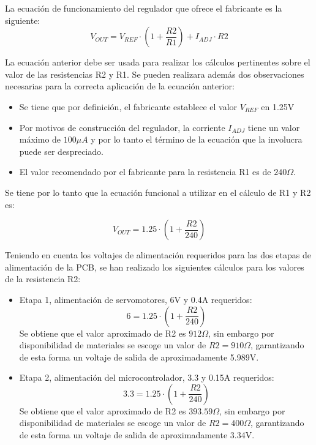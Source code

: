 La ecuación de funcionamiento del regulador que ofrece el fabricante es la siguiente:
\begin{equation}
    V_{OUT} = V_{REF} \cdot ( 1 + \frac{R2}{R1}) + I_{ADJ} \cdot R2
\end{equation}

La ecuación anterior debe ser usada para realizar los cálculos pertinentes sobre el valor de las resistencias R2 y R1. Se pueden realizara además dos observaciones necesarias para la correcta aplicación de la ecuación anterior:
\begin{itemize}
    \item Se tiene que por definición, el fabricante establece el valor $V_{REF}$ en 1.25V
    \item Por motivos de construcción del regulador, la corriente $I_{ADJ}$ tiene un valor máximo de $100 \mu A$ y por lo tanto el término de la ecuación que la involucra puede ser despreciado.
    \item El valor recomendado por el fabricante para la resistencia R1 es de $240 \Omega$.
\end{itemize}

Se tiene por lo tanto que la ecuación funcional a utilizar en el cálculo de R1 y R2 es:

\begin{equation}
    V_{OUT} = 1.25 \cdot ( 1 + \frac{R2}{240}) 
\end{equation}

Teniendo en cuenta los voltajes de alimentación requeridos para las dos etapas de alimentación de la PCB, se han realizado los siguientes cálculos para los valores de la resistencia R2:
\begin{itemize}
    \item Etapa 1, alimentación de servomotores, 6V y 0.4A requeridos:
    \begin{equation}
        6 = 1.25 \cdot ( 1 + \frac{R2}{240}) 
    \end{equation}
    Se obtiene que el valor aproximado de R2 es $912 \Omega$, sin embargo por disponibilidad de materiales se escoge un valor de $R2 = 910 \Omega$, garantizando de esta forma un voltaje de salida de aproximadamente 5.989V.
    
    \item Etapa 2, alimentación del microcontrolador, 3.3 y 0.15A requeridos:
    \begin{equation}
        3.3 = 1.25 \cdot ( 1 + \frac{R2}{240}) 
    \end{equation}
    Se obtiene que el valor aproximado de R2 es $393.59 \Omega$, sin embargo por disponibilidad de materiales se escoge un valor de $R2 = 400 \Omega$, garantizando de esta forma un voltaje de salida de aproximadamente 3.34V.
\end{itemize}


